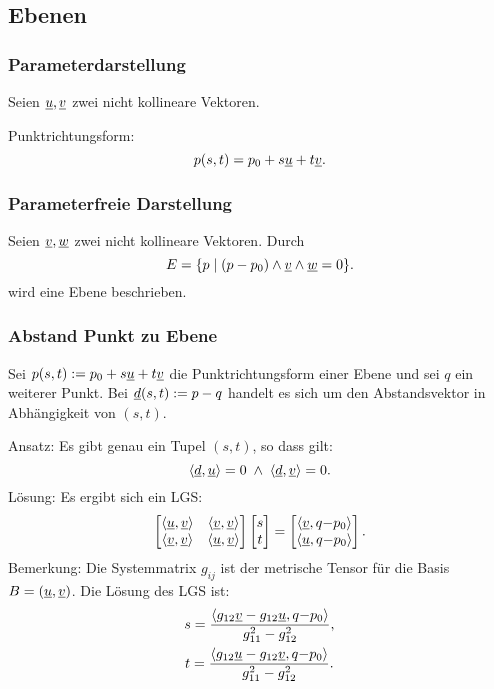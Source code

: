 \subsection{Ebenen}
\subsubsection{Parameterdarstellung}
Seien $\underline{u}, \underline{v}$ zwei nicht kollineare Vektoren.

Punktrichtungsform:
\begin{equation}
p(s,t) = p_0+s\underline{u}+t\underline{v}.
\end{equation}

\subsubsection{Parameterfreie Darstellung}
Seien $\underline{v}, \underline{w}$ zwei nicht kollineare Vektoren.
Durch
\begin{equation}
E = \{p\mid (p-p_0)\wedge\underline{v}\wedge\underline{w}=0\}.
\end{equation}
wird eine Ebene beschrieben.

\subsubsection{Abstand Punkt zu Ebene}
Sei $p(s,t):=p_0+s\underline{u}+t\underline{v}$ die Punktrichtungsform einer Ebene
und sei $q$ ein weiterer Punkt. Bei $\underline{d}(s,t):=p-q$ handelt es sich um
den Abstandsvektor in Abhängigkeit von $(s,t)$.

Ansatz: Es gibt genau ein Tupel $(s,t)$, so dass gilt:
\begin{equation}
\langle\underline{d},\underline{u}\rangle=0  \;\land\; \langle\underline{d},\underline{v}\rangle=0.
\end{equation}
Lösung: Es ergibt sich ein LGS:
\begin{equation}
\begin{bmatrix}
\langle\underline{u},\underline{v}\rangle & \langle\underline{v},\underline{v}\rangle\\
\langle\underline{v},\underline{v}\rangle & \langle\underline{u},\underline{v}\rangle
\end{bmatrix}
\begin{bmatrix}
s\\ t
\end{bmatrix}
= \begin{bmatrix}
\langle\underline{v},q{-}p_0\rangle\\
\langle\underline{u},q{-}p_0\rangle
\end{bmatrix}.
\end{equation}
Bemerkung: Die Systemmatrix $g_{ij}$ ist der metrische Tensor für die
Basis $B=(\underline{u},\underline{v})$. Die Lösung des LGS ist:
\begin{gather}
s = \frac
  {\langle g_{12}\underline{v}-g_{12}\underline{u}, q{-}p_0\rangle}
  {g_{11}^2-g_{12}^2},\\
t = \frac
  {\langle g_{12}\underline{u}-g_{12}\underline{v}, q{-}p_0\rangle}
  {g_{11}^2-g_{12}^2}.
\end{gather}

